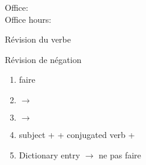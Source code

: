 \documentclass{beamer}
\subtitle[Nos loisirs (encore)]{Nos loisirs (encore)}
\begin{document}
  \begin{frame}
    \titlepage
    \tiny{Office: \\
          Office hours: }
  \end{frame}

  \begin{frame}{Révision du verbe }
    \begin{center}
      
    \end{center}
  \end{frame}

  \begin{frame}{Révision de négation}
    \begin{enumerate}
      \item faire 
      \item<2->  $\to$ \underline{}
      \item<4->  $\to$ \underline{}
      \item<6-> subject +  + conjugated verb + 
      \item<7-> Dictionary entry $\to$ ne pas faire
    \end{enumerate}
  \end{frame}
\end{document}
